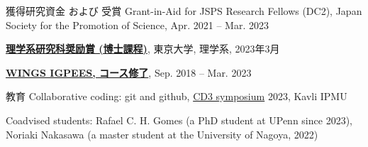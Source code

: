 
\begin{rSection}{獲得研究資金 および 受賞}
  Grant-in-Aid for JSPS Research Fellows (DC2), Japan Society for the Promotion of Science, Apr. 2021 -- Mar. 2023

  {\textbf{\href{https://www.phys.s.u-tokyo.ac.jp/award/37776/}{理学系研究科奨励賞 (博士課程)}}}, 東京大学, 理学系, 2023年3月

  {\textbf{\href{https://www.s.u-tokyo.ac.jp/en/IGPEES/}{WINGS IGPEES, コース修了}}}, Sep. 2018 -- Mar. 2023
\end{rSection}

\begin{rSection}{教育}
  Collaborative coding: git and github, \href{https://cd3.ipmu.jp/opening/}{CD3 symposium} 2023, Kavli IPMU

  Coadvised students: Rafael C. H. Gomes (a PhD student at UPenn since 2023), Noriaki Nakasawa (a master student at the University of Nagoya, 2022)
\end{rSection}


